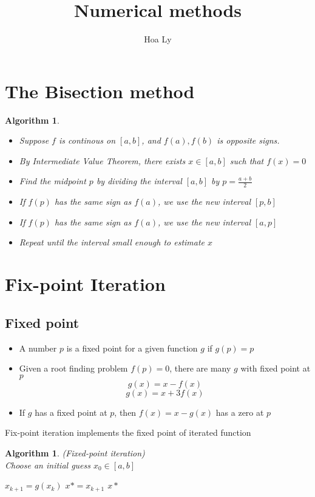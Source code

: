 \documentclass[12pt]{article}
\title{Numerical methods }
\author{Hoa Ly}
\newtheorem{alg}[theorem]{Algorithm}
\begin{document}
\maketitle
{}
\tableofcontents
\newpage

\section{The Bisection method}
\begin{alg}
\begin{itemize}
	\item Suppose $f$ is continous on $[a,b]$, and $f(a),f(b)$ is opposite signs.
	\item By Intermediate Value Theorem, there exists $x \in [a,b]$ such that $f(x) = 0$
	\item Find the midpoint $p$ by dividing the interval $[a,b]$ by $p = \frac{a+b}{2}$
	\item If $f(p)$ has the same sign as $f(a)$, we use the new interval $[p,b]$
	\item If $f(p)$ has the same sign as $f(a)$, we use the new interval $[a,p]$
	\item Repeat until the interval small enough to estimate $x$
	
\end{itemize}
\end{alg}


\section{Fix-point Iteration}
\subsection{Fixed point} \begin{itemize}
	\item A number $p$ is a fixed point for a given function $g$ if $g(p) = p$
	\item Given a root finding problem $f(p) = 0$, there are many $g$ with fixed point at $p$
	$$g(x) = x - f(x)$$ $$g(x) = x + 3f(x)$$
	\item If $g$ has a fixed point at $p$, then $f(x) = x -g(x)$ has a zero at $p$
\end{itemize}
Fix-point iteration implements the fixed point of iterated function \\ 
\begin{alg}(Fixed-point iteration) \\
Choose an initial guess $x_0 \in [a,b]$
\begin{algorithmic}
\State $x_{k+1} = g(x_k)$
\State $x* = x_{k+1}$
\State \Return $x*$
\EndIf
\EndFor
\end{algorithmic}

\end{alg}
\end{document}
